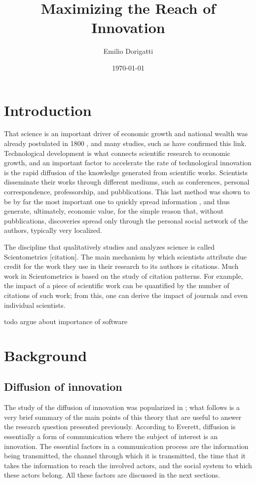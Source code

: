 \documentclass[12pt]{article}
\author{Emilio Dorigatti}
\date{\today}
\title{Maximizing the Reach of Innovation}
\begin{document}
\maketitle


\section{Introduction}
\label{sec:org05fd84b}
That science is an important driver of economic growth and national wealth was already postulated in 1800 \citep{marxecon}, and many studies, such as \citep{pharmaresearch} have confirmed this link. Technological development is what connects scientific research to economic growth, and an important factor to accelerate the rate of technological innovation is the rapid diffusion of the knowledge generated from scientific works. Scientists disseminate their works through different mediums, such as conferences, personal correspondence, professorship, and pubblications. This last method was shown to be by far the most important one to quickly spread information \citep{diffknowl}, and thus generate, ultimately, economic value, for the simple reason that, without pubblications, discoveries spread only through the personal social network of the authors, typically very localized.

The discipline that qualitatively studies and analyzes science is called Scientometrics [citation]. The main mechanism by which scientists attribute due credit for the work they use in their research to its authors is citations. Much work in Scientometrics is based on the study of citation patterns. For example, the impact of a piece of scientific work can be quantified by the number of citations of such work; from this, one can derive the impact of journals and even individual scientists.

todo argue about importance of software

\section{Background}
\label{sec:org6ee30c8}
\subsection{Diffusion of innovation}
\label{sec:orgec5c6ef}
The study of the diffusion of innovation was popularized in \cite{everett}; what follows is a very brief summary of the main points of this theory that are useful to answer the research question presented previously. According to Everett, diffusion is essentially a form of communication where the subject of interest is an innovation. The essential factors in a communication process are the information being transmitted, the channel through which it is transmitted, the time that it takes the information to reach the involved actors, and the social system to which these actors belong. All these factors are discussed in the next sections.
\end{document}
